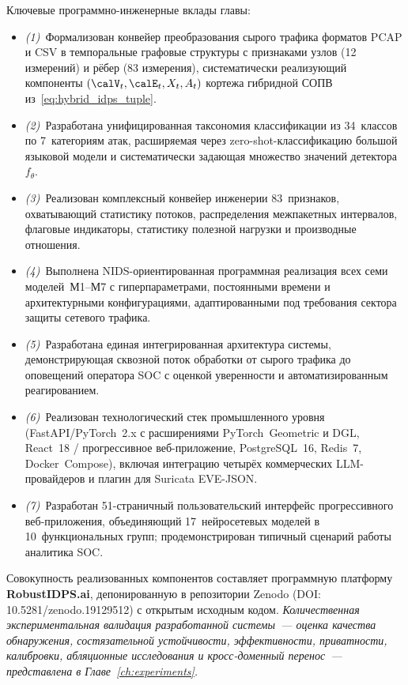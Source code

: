Ключевые программно-инженерные вклады главы:
\begin{itemize}\setlength\itemsep{2pt}
\item \emph{(1)}~Формализован конвейер преобразования сырого
трафика форматов PCAP и CSV в темпоральные графовые структуры с
признаками узлов (12 измерений) и рёбер (83 измерения),
систематически реализующий компоненты
$(\calV_t, \calE_t, X_t, A_t)$ кортежа гибридной СОПВ
из~\eqref{eq:hybrid_idps_tuple}.
\item \emph{(2)}~Разработана унифицированная таксономия классификации
из 34~классов по 7~категориям атак, расширяемая через
zero-shot-классификацию большой языковой модели и систематически
задающая множество значений детектора~$f_\theta$.
\item \emph{(3)}~Реализован комплексный конвейер инженерии
83~признаков, охватывающий статистику потоков, распределения
межпакетных интервалов, флаговые индикаторы, статистику полезной
нагрузки и производные отношения.
\item \emph{(4)}~Выполнена NIDS-ориентированная программная
реализация всех семи моделей~М1--М7 с гиперпараметрами,
постоянными времени и архитектурными конфигурациями,
адаптированными под требования сектора защиты сетевого трафика.
\item \emph{(5)}~Разработана единая интегрированная архитектура
системы, демонстрирующая сквозной поток обработки от сырого
трафика до оповещений оператора SOC с оценкой уверенности и
автоматизированным реагированием.
\item \emph{(6)}~Реализован технологический стек промышленного
уровня (FastAPI/PyTorch~2.x с расширениями PyTorch~Geometric и
DGL, React~18 / прогрессивное веб-приложение, PostgreSQL~16,
Redis~7, Docker~Compose), включая интеграцию четырёх коммерческих
LLM-провайдеров и плагин для Suricata EVE-JSON.
\item \emph{(7)}~Разработан 51-страничный пользовательский интерфейс
прогрессивного веб-приложения, объединяющий 17~нейросетевых
моделей в 10~функциональных групп; продемонстрирован типичный
сценарий работы аналитика SOC.
\end{itemize}

Совокупность реализованных компонентов составляет программную
платформу \textbf{RobustIDPS.ai}, депонированную в репозитории Zenodo
(DOI: 10.5281/zenodo.19129512) с открытым исходным кодом.
\emph{Количественная экспериментальная валидация разработанной
системы~--- оценка качества обнаружения, состязательной
устойчивости, эффективности, приватности, калибровки,
абляционные исследования и кросс-доменный перенос~--- представлена
в Главе~\ref{ch:experiments}.}

